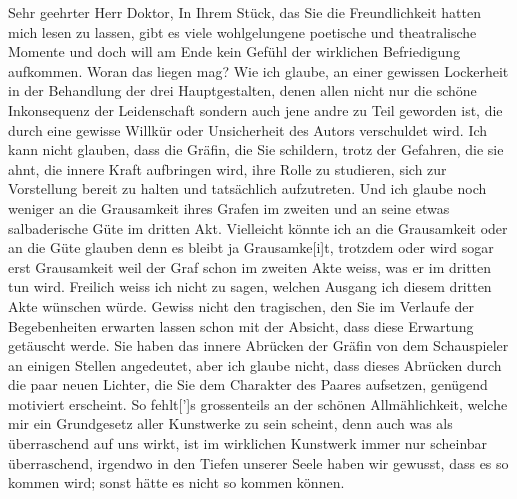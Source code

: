 \pstart\center{}Sehr geehrter Herr Doktor, \pend\vspace{0.5em}
\pstart
           In Ihrem Stück, das Sie die
               Freundlichkeit hatten mich lesen zu lassen, gibt es viele wohlgelungene poetische und
               theatralische Momente und doch will am Ende kein Gefühl der wirklichen Befriedigung
               aufkommen. Woran das liegen mag? Wie ich glaube, an einer gewissen Lockerheit in der
               Behandlung der drei Hauptgestalten, denen allen nicht nur die schöne Inkonsequenz der
               Leidenschaft sondern auch jene andre zu Teil geworden ist, die durch eine gewisse
               Willkür oder Unsicherheit des Autors verschuldet wird. Ich kann nicht glauben, dass
               die Gräfin, die Sie schildern, trotz der Gefahren, die sie ahnt, die innere Kraft
               aufbringen wird, ihre Rolle zu studieren, sich zur Vorstellung bereit zu halten und
               tatsächlich aufzutreten. Und ich glaube noch weniger an die Grausamkeit ihres Grafen
               im zweiten und an seine etwas salbaderische Güte im dritten Akt. Vielleicht könnte
               ich an die Grausamkeit oder an {\pb}die Güte glauben  denn es bleibt ja Grausamke{[}i{]}t,
               trotzdem oder wird sogar erst Grausamkeit weil der Graf schon im zweiten Akte weiss,
               was er im dritten tun wird. Freilich weiss ich nicht zu sagen, welchen Ausgang ich
               diesem dritten Akte wünschen würde. Gewiss nicht den tragischen, den Sie im Verlaufe
               der Begebenheiten erwarten lassen schon mit der Absicht, dass diese Erwartung
               getäuscht werde. Sie haben das innere Abrücken der Gräfin von dem Schauspieler an
               einigen Stellen angedeutet, aber ich glaube nicht, dass dieses Abrücken durch die
               paar neuen Lichter, die Sie dem Charakter des Paares aufsetzen, genügend motiviert
               erscheint. So fehlt{[}’{]}s grossenteils an der schönen
               Allmählichkeit, welche mir ein Grundgesetz aller Kunstwerke zu sein scheint, denn
               auch was als überraschend auf uns wirkt, ist im wirklichen Kunstwerk immer nur
               scheinbar überraschend, irgendwo in den Tiefen unserer Seele haben wir gewusst, dass
               es so kommen wird; sonst hätte es nicht so kommen können.\pend
           
